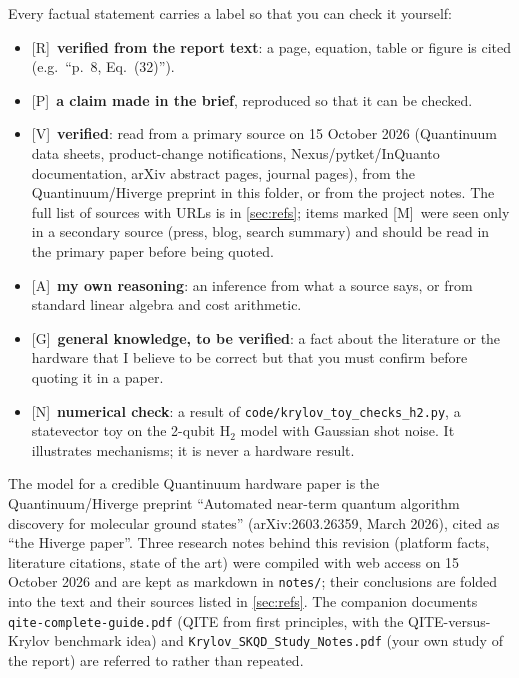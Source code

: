 \documentclass[11pt,a4paper]{article}
\newcommand{\report}{the report}
\newcommand{\lR}{\textcolor{keyblue}{[R]}}   %
\newcommand{\lP}{\textcolor{keyblue}{[P]}}   %
\newcommand{\lV}{\textcolor{keyblue}{[V]}}   %
\newcommand{\lA}{\textcolor{notegray}{[A]}}  %
\newcommand{\lG}{\textcolor{alertred}{[G]}}  %
\newcommand{\lM}{\textcolor{alertred}{[M]}}  %
\newcommand{\lN}{\textcolor{keyblue}{[N]}}   %
\begin{document}
Every factual statement carries a label so that you can check it yourself:
\begin{itemize}
\item \lR\ \textbf{verified from the report text}: a page, equation, table or figure is cited (e.g.\ ``p.~8, Eq.~(32)'').
\item \lP\ \textbf{a claim made in the brief}, reproduced so that it can be checked.
\item \lV\ \textbf{verified}: read from a primary source on 15 October 2026 (Quantinuum data sheets, product-change notifications, Nexus/pytket/InQuanto documentation, arXiv abstract pages, journal pages), from the Quantinuum/Hiverge preprint in this folder, or from the project notes. The full list of sources with URLs is in \cref{sec:refs}; items marked \lM\ were seen only in a secondary source (press, blog, search summary) and should be read in the primary paper before being quoted.
\item \lA\ \textbf{my own reasoning}: an inference from what a source says, or from standard linear algebra and cost arithmetic.
\item \lG\ \textbf{general knowledge, to be verified}: a fact about the literature or the hardware that I believe to be correct but that you must confirm before quoting it in a paper.
\item \lN\ \textbf{numerical check}: a result of \texttt{code/krylov\_toy\_checks\_h2.py}, a statevector toy on the 2-qubit H$_2$ model with Gaussian shot noise. It illustrates mechanisms; it is \alert{never a hardware result}.
\end{itemize}
{\sloppy The model for a credible Quantinuum hardware paper is the Quantinuum/Hiverge preprint ``Automated near-term quantum algorithm discovery for molecular ground states'' (arXiv:2603.26359, March 2026), cited as ``the Hiverge paper''. Three research notes behind this revision (platform facts, literature citations, state of the art) were compiled with web access on 15 October 2026 and are kept as markdown in \texttt{notes/}; their conclusions are folded into the text and their sources listed in \cref{sec:refs}. The companion documents \texttt{qite-complete-guide.pdf} (QITE from first principles, with the QITE-versus-Krylov benchmark idea) and \texttt{Krylov\_SKQD\_Study\_Notes.pdf} (your own study of \report) are referred to rather than repeated.\par}
\end{document}

